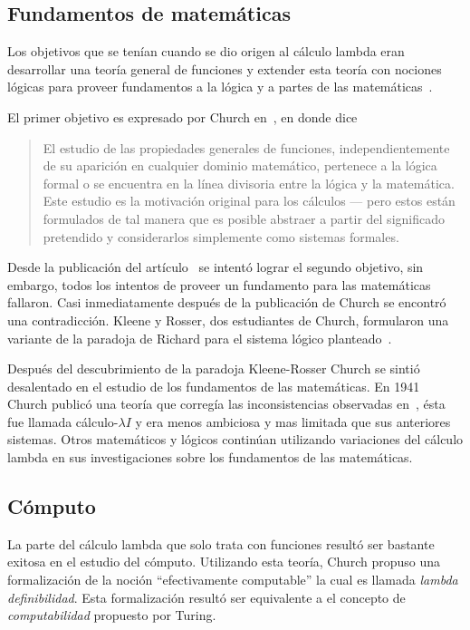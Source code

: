 \subsection{Fundamentos de matemáticas}

Los objetivos que se tenían cuando se dio origen al cálculo lambda eran
desarrollar una teoría general de funciones y extender esta teoría con nociones
lógicas para proveer fundamentos a la lógica y a partes de las
matemáticas~\cite{Barendregt:Bible}.\

El primer objetivo es expresado por Church en~\cite{Church:LambdaConversion}, en
donde dice

\begin{quote}
El estudio de las propiedades generales de funciones, independientemente de su
aparición en cualquier dominio matemático, pertenece a la lógica formal o se
encuentra en la línea divisoria entre la lógica y la matemática. Este estudio es
la motivación original para los cálculos --- pero estos están formulados de tal
manera que es posible abstraer a partir del significado pretendido y
considerarlos simplemente como sistemas formales.
\end{quote}

Desde la publicación del artículo~\cite{Church:FoundationsLogic} se intentó
lograr el segundo objetivo, sin embargo, todos los intentos de proveer un
fundamento para las matemáticas fallaron. Casi inmediatamente después de la
publicación de Church se encontró una contradicción. Kleene y Rosser, dos
estudiantes de Church, formularon una variante de la paradoja de Richard para el
sistema lógico planteado~\cite{KleeneRosser:paradox}.\

Después del descubrimiento de la paradoja Kleene-Rosser Church se sintió
desalentado en el estudio de los fundamentos de las matemáticas. En 1941 Church
publicó una teoría que corregía las inconsistencias observadas
en~\cite{KleeneRosser:paradox}, ésta fue llamada cálculo-\(\lambda I\) y era menos
ambiciosa y mas limitada que sus anteriores sistemas. Otros matemáticos y
lógicos continúan utilizando variaciones del cálculo lambda en sus
investigaciones sobre los fundamentos de las matemáticas.\

\subsection{Cómputo}

La parte del cálculo lambda que solo trata con funciones resultó ser bastante
exitosa en el estudio del cómputo. Utilizando esta teoría, Church propuso una
formalización de la noción ``efectivamente computable'' la cual es llamada
\emph{lambda definibilidad}. Esta formalización resultó ser equivalente a el
concepto de \emph{computabilidad} propuesto por Turing.\

